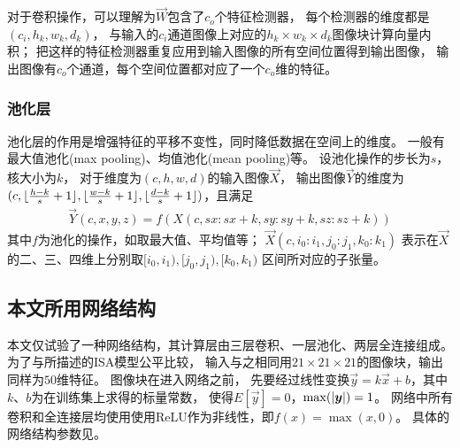 对于卷积操作，可以理解为$\vec{W}$包含了$c_o$个特征检测器，
每个检测器的维度都是$(c_i, h_k, w_k, d_k)$，
与输入的$c_i$通道图像上对应的$h_k \times w_k \times d_k$图像块计算向量内积；
把这样的特征检测器重复应用到输入图像的所有空间位置得到输出图像，
输出图像有$c_o$个通道，每个空间位置都对应了一个$c_o$维的特征。

\subsubsection{池化层}
池化层的作用是增强特征的平移不变性，同时降低数据在空间上的维度。
一般有最大值池化(max pooling)、均值池化(mean pooling)等。
设池化操作的步长为$s$，核大小为$k$，
对于维度为$(c, h, w, d)$的输入图像$\vec{X}$，
输出图像$\vec{Y}$的维度为$(c, \lfloor\frac{h-k}{s}+1\rfloor,
\lfloor\frac{w-k}{s}+1\rfloor, \lfloor\frac{d-k}{s}+1\rfloor)$，且满足
\begin{eqnarray}
    \vec{Y}(c, x, y, z) = f(X(c, sx:sx+k, sy:sy+k, sz:sz+k))
\end{eqnarray}
其中$f$为池化的操作，如取最大值、平均值等；
$\vec{X}(c, i_0:i_1, j_0:j_1, k_0:k_1)$
表示在$\vec{X}$的二、三、四维上分别取$[i_0, i_1), [j_0, j_1), [k_0, k_1)$
区间所对应的子张量。


\subsection{本文所用网络结构}
本文仅试验了一种网络结构，其计算层由三层卷积、一层池化、两层全连接组成。
为了与所描述的ISA模型公平比较，
输入与之相同用$21\times 21 \times 21$的图像块，输出同样为$50$维特征。
图像块在进入网络之前，
先要经过线性变换$\vec{y}=k\vec{x}+b$，其中$k$、$b$为在训练集上求得的标量常数，
使得$E[\vec{y}]=0$，$\max(\left|\boldsymbol{y}\right|)=1$。
网络中所有卷积和全连接层均使用使用ReLU作为非线性，即$f(x)=\max(x, 0)$。
具体的网络结构参数见。

